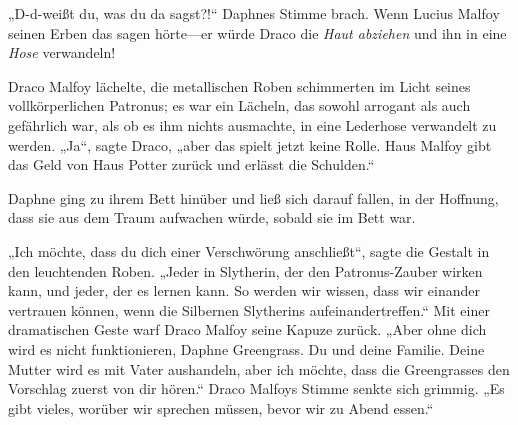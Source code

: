 „D-d-weißt du, was du da sagst?!“ Daphnes Stimme brach.
Wenn Lucius Malfoy seinen Erben das sagen hörte—er würde Draco die \emph{Haut abziehen} und ihn in eine \emph{Hose} verwandeln!

Draco Malfoy lächelte, die metallischen Roben schimmerten im Licht seines vollkörperlichen Patronus; es war ein Lächeln, das sowohl arrogant als auch gefährlich war, als ob es ihm nichts ausmachte, in eine Lederhose verwandelt zu werden.
„Ja“, sagte Draco, „aber das spielt jetzt keine Rolle. Haus Malfoy gibt das Geld von Haus Potter zurück und erlässt die Schulden.“

Daphne ging zu ihrem Bett hinüber und ließ sich darauf fallen, in der Hoffnung, dass sie aus dem Traum aufwachen würde, sobald sie im Bett war.

„Ich möchte, dass du dich einer Verschwörung anschließt“, sagte die Gestalt in den leuchtenden Roben. „Jeder in Slytherin, der den Patronus-Zauber wirken kann, und jeder, der es lernen kann. So werden wir wissen, dass wir einander vertrauen können, wenn die Silbernen Slytherins aufeinandertreffen.“
Mit einer dramatischen Geste warf Draco Malfoy seine Kapuze zurück.
„Aber ohne dich wird es nicht funktionieren, Daphne Greengrass. Du und deine Familie. Deine Mutter wird es mit Vater aushandeln, aber ich möchte, dass die Greengrasses den Vorschlag zuerst von dir hören.“
Draco Malfoys Stimme senkte sich grimmig.
„Es gibt vieles, worüber wir sprechen müssen, bevor wir zu Abend essen.“

